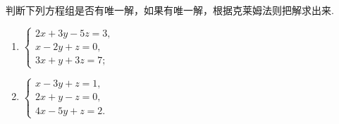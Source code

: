 \begin{example}
  判断下列方程组是否有唯一解，如果有唯一解，根据克莱姆法则把解求出来.
\begin{multicols}{2}
\begin{enumerate}[(1)]
  \item $\begin{cases}
  2x+3y-5z=3,\\
  x-2y+z=0,\\
  3x+y+3z=7;
\end{cases}$
  \item $\begin{cases}
    x-3y+z=1,\\
    2x+y-z=0,\\
    4x-5y+z=2.
  \end{cases}$
\end{enumerate}
\end{multicols}
\end{example}

